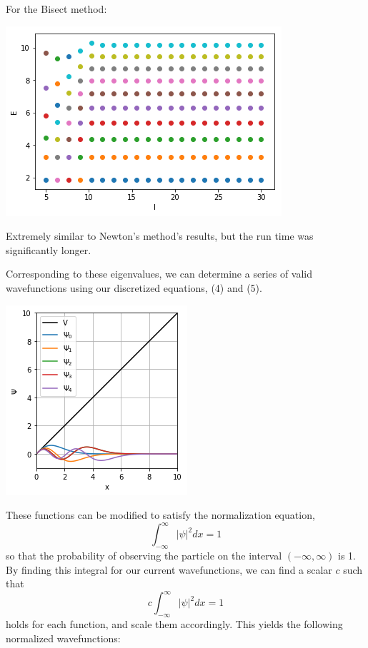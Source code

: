\documentclass[12pt]{article}
\begin{document}
For the Bisect method:
\begin{center}
\includegraphics{bisectEigen.png}
\end{center}
 
Extremely similar to Newton's method's results, but the run time was significantly longer.

\bigbreak

Corresponding to these eigenvalues, we can determine a series of valid wavefunctions using our discretized equations, (4) and (5).

\begin{center}
\includegraphics{psiNotNorm.png}
\end{center}

\bigbreak

These functions can be modified to satisfy the normalization equation, 
\begin{equation}
\int_{-\infty}^{\infty}|\psi|^{2}dx = 1
\end{equation}
so that the probability of observing the particle on the interval $(-\infty,\infty)$ is 1. By finding this integral for our current wavefunctions, we can find a scalar $c$ such that
\begin{equation}
c\int_{-\infty}^{\infty}|\psi|^{2}dx = 1
\end{equation}
holds for each function, and scale them accordingly. This yields the following normalized wavefunctions:
\end{document}
